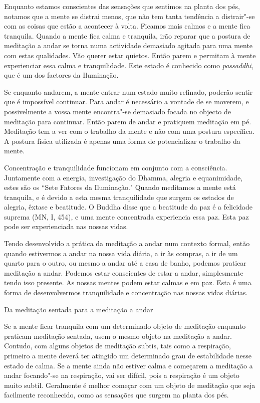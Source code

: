 Enquanto estamos conscientes das sensações que sentimos na planta dos
pés, notamos que a mente se distrai menos, que não tem tanta tendência a
distrair"-se com as coisas que estão a acontecer à volta. Ficamos mais
calmos e a mente fica tranquila. Quando a mente fica calma e tranquila,
irão reparar que a postura de meditação a andar se torna numa actividade
demasiado agitada para uma mente com estas qualidades. Vão querer estar
quietos. Então parem e permitam à mente experienciar essa calma e
tranquilidade. Este estado é conhecido como \emph{passaddhi}, que é um
dos factores da Iluminação.

Se enquanto andarem, a mente entrar num estado muito refinado, poderão
sentir que é impossível continuar. Para andar é necessário a vontade de
se moverem, e possivelmente a vossa mente encontra"-se demasiado focada
no objecto de meditação para continuar. Então parem de andar e pratiquem
meditação em pé. Meditação tem a ver com o trabalho da mente e não com
uma postura específica. A postura física utilizada é apenas uma forma de
potencializar o trabalho da mente.

Concentração e tranquilidade funcionam em conjunto com a consciência.
Juntamente com a energia, investigação do Dhamma, alegria e
equanimidade, estes são os ``Sete Fatores da Iluminação."
Quando
meditamos a mente está tranquila, e é devido a esta mesma
tranquilidade que surgem os estados de alegria, êxtase e beatitude. O
Buddha disse que a beatitude da paz é a felicidade suprema (MN, I, 454),
e uma mente concentrada experiencia essa paz. Esta paz pode ser
experienciada nas nossas vidas.

Tendo desenvolvido a prática da meditação a andar num contexto formal,
então quando estivermos a andar na nossa vida diária, a ir às compras, a
ir de um quarto para o outro, ou mesmo a andar até a casa de banho,
podemos praticar meditação a andar. Podemos estar conscientes de estar a
andar, simplesmente tendo isso presente. As nossas mentes podem estar
calmas e em paz. Esta é uma forma de desenvolvermos tranquilidade e
concentração nas nossas vidas diárias.

\begin{siderule-quote}
  Da meditação sentada para a meditação a andar
\end{siderule-quote}

Se a mente ficar tranquila com um determinado objeto de meditação
enquanto praticam meditação sentada, usem o mesmo objeto na meditação a
andar. Contudo, com alguns objetos de meditação subtis, tais como a
respiração, primeiro a mente deverá ter atingido um determinado grau de
estabilidade nesse estado de calma. Se a mente ainda não estiver calma e
começarem a meditação a andar focando"-se na respiração, vai ser difícil,
pois a respiração é um objeto muito subtil. Geralmente é melhor começar
com um objeto de meditação que seja facilmente reconhecido, como as
sensações que surgem na planta dos pés.

